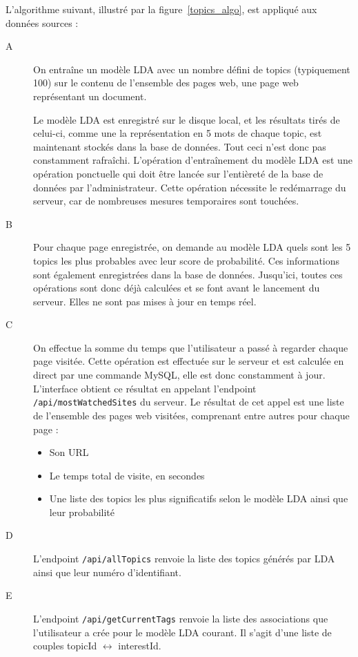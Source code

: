 		L'algorithme suivant, illustré par la figure~\ref{topics_algo}, est appliqué aux données sources :
		\begin{description}
			\item[A] On entraîne un modèle LDA avec un nombre défini de topics (typiquement 100) sur le contenu de l'ensemble des pages web, une page web représentant un document.

			Le modèle LDA est enregistré sur le disque local, et les résultats tirés de celui-ci, comme une la représentation en 5 mots de chaque topic, est maintenant stockés dans la base de données. Tout ceci n'est donc pas constamment rafraîchi. L'opération d'entraînement du modèle LDA est une opération ponctuelle qui doit être lancée sur l'entièreté de la base de données par l'administrateur. Cette opération nécessite le redémarrage du serveur, car de nombreuses mesures temporaires sont touchées.

			\item[B] Pour chaque page enregistrée, on demande au modèle LDA quels sont les 5 topics les plus probables avec leur score de probabilité. Ces informations sont également enregistrées dans la base de données. Jusqu'ici, toutes ces opérations sont donc déjà calculées et se font avant le lancement du serveur. Elles ne sont pas mises à jour en temps réel.
			
			\item[C] On effectue la somme du temps que l'utilisateur a passé à regarder chaque page visitée. Cette opération est effectuée sur le serveur et est calculée en direct par une commande MySQL, elle est donc constamment à jour. L'interface obtient ce résultat en appelant l'endpoint \texttt{/api/mostWatchedSites} du serveur. Le résultat de cet appel est une liste de l'ensemble des pages web visitées, comprenant entre autres pour chaque page : 
			\begin{itemize}
				\item Son URL
				\item Le temps total de visite, en secondes
				\item Une liste des topics les plus significatifs selon le modèle LDA ainsi que leur probabilité
			\end{itemize}

			\item[D] L'endpoint \texttt{/api/allTopics} renvoie la liste des topics générés par LDA ainsi que leur numéro d'identifiant.

			\item[E] L'endpoint \texttt{/api/getCurrentTags} renvoie la liste des associations que l'utilisateur a crée pour le modèle LDA courant. Il s'agit d'une liste de couples topicId $\longleftrightarrow$ interestId.


\end{description}
